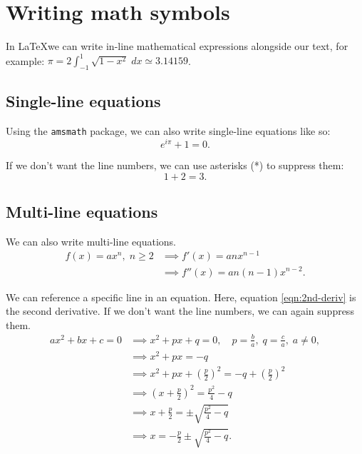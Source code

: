\documentclass{article}[12pt]
\begin{document}
    \section{Writing math symbols}
        
        In \LaTeX we can write in-line mathematical expressions alongside our text, for example: $\pi = 2\int_{-1}^{1}\sqrt{1 - x^2} \; dx \simeq 3.14159 $. \newline
        
    \subsection{Single-line equations}
    
        Using the \texttt{amsmath} package, we can also write single-line equations like so:
        \begin{equation}
            e^{i\pi} + 1 = 0.
        \end{equation}
        
        If we don't want the line numbers, we can use asterisks (*) to suppress them:
        \begin{equation*}
            1 + 2 = 3.
        \end{equation*}
    
    \subsection{Multi-line equations}
    
        We can also write multi-line equations.
        \begin{align}
            f(x) = a x^n, \; n \ge 2
            &\implies
            f'(x) = a n x^{n-1} \\  
            &\implies
            f''(x) = a n (n-1) x^{n-2}. \label{eqn:2nd-deriv}
        \end{align}
        
        We can reference a specific line in an equation. Here, equation \eqref{eqn:2nd-deriv} is the second derivative. If we don't want the line numbers, we can again suppress them.
        \begin{align*}
            a x^2 + b x + c = 0
            & \implies x^2 + p x + q = 0,
            \quad p = \frac{b}{a}, \; q = \frac{c}{a}, \; a \ne 0,
            \\
            & \implies x^2 + p x = -q
            \\
            & \implies x^2 + p x + \left(\frac{p}{2}\right)^2
            = -q + \left(\frac{p}{2}\right)^2
            \\
            & \implies \left( x + \frac{p}{2} \right)^2
            = \frac{p^2}{4} - q
            \\
            & \implies x + \frac{p}{2}
            = \pm \sqrt{ \frac{p^2}{4} - q }
            \\
            & \implies x
            = -\frac{p}{2} \pm \sqrt{ \frac{p^2}{4} - q }.
        \end{align*}
    
\end{document}

